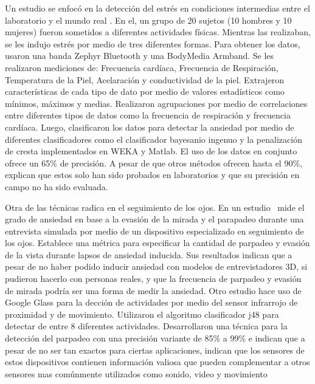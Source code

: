 \documentclass[letterpaper,12pt]{cicese}
\begin{document}
				Un estudio se enfoc\'o en la detecci\'on del estr\'es en condiciones intermedias entre el laboratorio y el mundo real \citep{RamosHD14}. En el, un grupo de 20 sujetos (10 hombres y 10 mujeres) fueron sometidos a diferentes actividades f\'isicas. Mientras las realizaban, se les indujo estr\'es por medio de tres diferentes formas. Para obtener los datos, usaron una banda Zephyr Bluetooth y una BodyMedia Armband. Se les realizaron mediciones de: Frecuencia card\'iaca, Frecuencia de Respiraci\'on, Temperatura de la Piel, Acelaraci\'on y conductividad de la piel. Extrajeron caracter\'isticas de cada tipo de dato por medio de valores estad\'isticos como m\'inimos, m\'aximos y medias. Realizaron agrupaciones por medio de correlaciones entre diferentes tipos de datos como la frecuencia de respiraci\'on y frecuencia card\'iaca. Luego, clasificaron los datos para detectar la ansiedad por medio de diferentes clasificadores como el clasificador bayesanio ingenuo y la penalizaci\'on de cresta implementados en WEKA y Matlab. El uso de los datos en conjunto ofrece un 65\% de precisi\'on. A pesar de que otros m\'etodos ofrecen hasta el 90\%, explican que estos solo han sido probados en laboratorios y que su precisi\'on en campo no ha sido evaluada.

				Otra de las t\'ecnicas radica en el seguimiento de los ojos. En un estudio \citep{Kwon2009} mide el grado de ansiedad en base a la evasi\'on de la mirada y el parapadeo durante una entrevista simulada por medio de un dispositivo especializado en seguimiento de los ojos. Establece una m\'etrica para especificar la cantidad de parpadeo y evasi\'on de la vista durante lapsos de ansiedad inducida. Sus resultados indican que a pesar de no haber podido inducir ansiedad con modelos de entrevistadores 3D, si pudieron hacerlo con personas reales, y que la frecuencia de parpadeo y evasi\'on de mirada podr\'ia ser una forma de medir la ansiedad. Otro estudio hace uso de Google Glass para la decci\'on de actividades por medio del sensor infrarrojo de proximidad y de movimiento. Utilizaron el algoritmo clasificador j48 para detectar de entre 8 diferentes actividades. Desarrollaron una t\'ecnica para la detecci\'on del parpadeo con una precisi\'on variante de 85\% a 99\% e indican que a pesar de no ser tan exactos para ciertas aplicaciones, indican que los sensores de estos dispositivos contienen informaci\'on valiosa que pueden complementar a otros sensores mas com\'unmente utilizados como sonido, video y movimiento \citep{Ishimaru2014}
					
\end{document}
